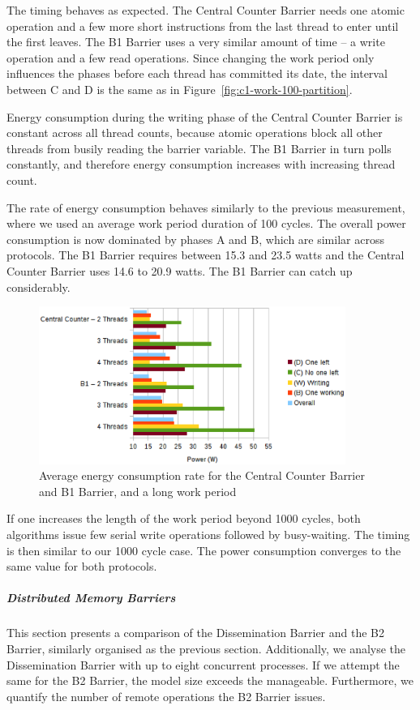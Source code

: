 \documentclass[a4paper, 10pt]{article}
\begin{document}
The timing behaves as expected. The Central Counter Barrier needs one atomic operation and a few more short instructions from the last thread to enter until the first leaves. The B1 Barrier uses a very similar amount of time -- a write operation and a few read operations.
Since changing the work period only influences the phases before each thread has committed its date, the interval between C and D is the same as in Figure~\ref{fig:c1-work-100-partition}.

Energy consumption during the writing phase of the Central Counter Barrier is constant across all thread counts, because atomic operations block all other threads from busily reading the barrier variable.
The B1 Barrier in turn polls constantly, and therefore energy consumption increases with increasing thread count.

The rate of energy consumption behaves similarly to the previous measurement, where we used an average work period duration of 100 cycles.
The overall power consumption is now dominated by phases A and B, which are similar across protocols. The B1 Barrier requires between 15.3 and 23.5 watts and the Central Counter Barrier uses 14.6 to 20.9 watts. The B1 Barrier can catch up considerably.
\begin{figure}[htbp]
	\centering
	\includegraphics[width=10cm]{charts/c1-power-work-1000}
	\caption{Average energy consumption rate for the Central Counter Barrier and B1 Barrier, and a long work period}
	\label{fig:c1-power-work-1000}
\end{figure}

If one increases the length of the work period beyond 1000 cycles, both algorithms issue few serial write operations followed by busy-waiting. The timing is then similar to our 1000 cycle case. The power consumption converges to the same value for both protocols.

\subparagraph{Distributed Memory Barriers}
\label{sssssec:analysis-modelchecking-quantitative-properties-evaluation-distributed}
This section presents a comparison of the Dissemination Barrier and the B2 Barrier, similarly organised as the previous section.
Additionally, we analyse the Dissemination Barrier with up to eight concurrent processes.
If we attempt the same for the B2 Barrier, the model size exceeds the manageable.
Furthermore, we quantify the number of remote operations the B2 Barrier issues.
\end{document}
